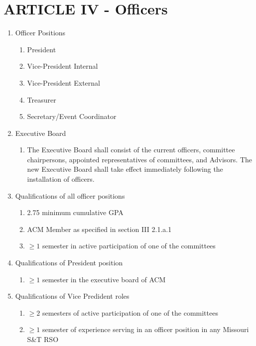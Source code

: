 \documentclass[11pt,a4paper,notitlepage]{article}
\begin{document}
\section*{ARTICLE IV - Officers}
\begin{enumerate}[label=\Alph*.]
  \item Officer Positions
    \begin{enumerate}[label=\arabic*.]
      \item President
      \item Vice-President Internal
      \item Vice-President External
      \item Treasurer
      \item Secretary/Event Coordinator
    \end{enumerate}
  \item Executive Board
    \begin{enumerate}[label=\arabic*.]
      \item The Executive Board shall consist of the current officers, committee
      chairpersons, appointed representatives of committees, and Advisors. The
      new Executive Board shall take effect immediately following the
      installation of officers.
    \end{enumerate}
  \item Qualifications of all officer positions
    \begin{enumerate}[label=\arabic*.]
      \item 2.75 minimum cumulative GPA
      \item ACM Member as specified in section III 2.1.a.1
      \item $\geq{1}$ semester in active participation of one of the committees
    \end{enumerate}
  \item Qualifications of President position
    \begin{enumerate}[label=\arabic*.]
      \item $\geq{1}$ semester in the executive board of ACM
    \end{enumerate}
  \item Qualifications of Vice Predident roles
    \begin{enumerate}[label=\arabic*.]
      \item $\geq{2}$ semesters of active participation of one of the committees
      \item $\geq{1}$ semester of experience serving in an officer position in
      any Missouri S\&T RSO
    \end{enumerate}
 

\end{enumerate}
\end{document}
